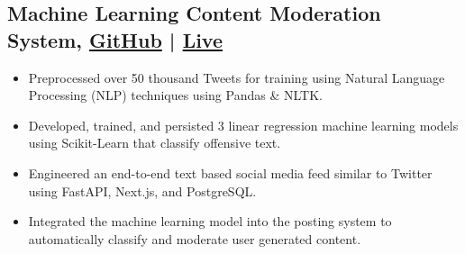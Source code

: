 \documentclass[a4,10pt]{article}
\newenvironment{zitemize}{
\begin{itemize}\itemsep0pt \parskip0pt \parsep1pt}
{\end{itemize}\vspace{-0.5cm}}
\begin{document}
\subsection*{Machine Learning Content Moderation System, {\normalsize \normalfont \href{https://github.com/xavierloeraflores/wgu-capstone}{GitHub}} | \normalsize \normalfont \href{https://wgu-capstone-xavier-loera-flores.vercel.app/}{Live} \hfill} 
\begin{zitemize}
       \item {Preprocessed over 50 thousand Tweets for training using Natural Language Processing (NLP) techniques using Pandas \& NLTK.} \\
       \item {Developed, trained, and persisted 3 linear regression machine learning models using Scikit-Learn that classify offensive text. } \\
       \item {Engineered an end-to-end text based social media feed similar to Twitter using FastAPI, Next.js, and PostgreSQL.} \\
        \item {Integrated the machine learning model into the posting system to automatically classify and moderate user generated content.} \\
       
     \end{zitemize}


\end{document}
